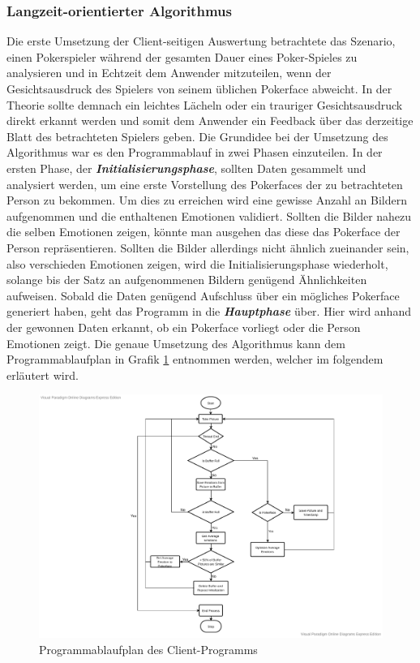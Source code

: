 \documentclass[12pt, a4paper]{scrbook}
\begin{document}
\subsubsection{Langzeit-orientierter Algorithmus}
Die erste Umsetzung der Client-seitigen Auswertung betrachtete das Szenario, einen Pokerspieler während der gesamten Dauer eines Poker-Spieles zu analysieren und in Echtzeit dem Anwender mitzuteilen, wenn der Gesichtsausdruck des Spielers von seinem üblichen Pokerface abweicht. In der Theorie sollte demnach ein leichtes Lächeln oder ein trauriger Gesichtsausdruck direkt erkannt werden und somit dem Anwender ein Feedback über das derzeitige Blatt des betrachteten Spielers geben.
Die Grundidee bei der Umsetzung des Algorithmus war es den Programmablauf in zwei Phasen einzuteilen. In der ersten Phase, der  \textit{\textbf{Initialisierungsphase}}, sollten Daten gesammelt und analysiert werden, um eine erste Vorstellung des Pokerfaces der zu betrachteten Person zu bekommen. Um dies zu erreichen wird eine gewisse Anzahl an Bildern aufgenommen und die enthaltenen Emotionen validiert. Sollten die Bilder nahezu die selben Emotionen zeigen, könnte man ausgehen das diese das Pokerface der Person repräsentieren. Sollten die Bilder allerdings nicht ähnlich zueinander sein, also verschieden Emotionen zeigen, wird die Initialisierungsphase wiederholt, solange bis der Satz an aufgenommenen Bildern genügend Ähnlichkeiten aufweisen.
 Sobald die Daten genügend Aufschluss über ein mögliches Pokerface generiert haben, geht das Programm in die  \textit{\textbf{Hauptphase}} über. Hier wird anhand der gewonnen Daten erkannt, ob ein Pokerface vorliegt oder die Person Emotionen zeigt.
Die genaue Umsetzung des Algorithmus kann dem Programmablaufplan in Grafik \ref{fig:flowchart} entnommen werden, welcher im folgendem erläutert wird.

\begin{figure}[H]
\includegraphics[width=\linewidth]{Bilder/ClientDataflow.pdf}
\caption{Programmablaufplan des Client-Programms}
\label{fig:flowchart}
\end{figure}
\end{document}

